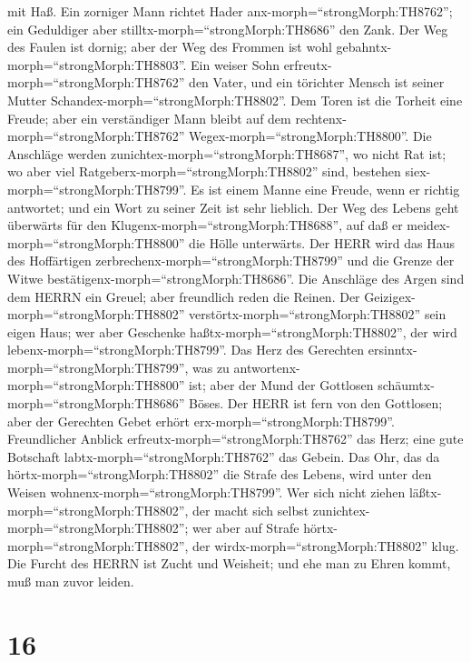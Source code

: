 mit Haß.  Ein zorniger Mann richtet Hader
anx-morph=``strongMorph:TH8762''; ein Geduldiger aber
stilltx-morph=``strongMorph:TH8686'' den Zank.  Der Weg des
Faulen ist dornig; aber der Weg des Frommen ist wohl
gebahntx-morph=``strongMorph:TH8803''.  Ein weiser Sohn
erfreutx-morph=``strongMorph:TH8762'' den Vater, und ein törichter
Mensch ist seiner Mutter Schandex-morph=``strongMorph:TH8802''.
 Dem Toren ist die Torheit eine Freude; aber ein
verständiger Mann bleibt auf dem rechtenx-morph=``strongMorph:TH8762''
Wegex-morph=``strongMorph:TH8800''.  Die Anschläge werden
zunichtex-morph=``strongMorph:TH8687'', wo nicht Rat ist; wo aber viel
Ratgeberx-morph=``strongMorph:TH8802'' sind, bestehen
siex-morph=``strongMorph:TH8799''.  Es ist einem Manne eine
Freude, wenn er richtig antwortet; und ein Wort zu seiner Zeit ist sehr
lieblich.  Der Weg des Lebens geht überwärts für den
Klugenx-morph=``strongMorph:TH8688'', auf daß er
meidex-morph=``strongMorph:TH8800'' die Hölle unterwärts. 
Der HERR wird das Haus des Hoffärtigen
zerbrechenx-morph=``strongMorph:TH8799'' und die Grenze der Witwe
bestätigenx-morph=``strongMorph:TH8686''.  Die Anschläge
des Argen sind dem HERRN ein Greuel; aber freundlich reden die Reinen.
 Der Geizigex-morph=``strongMorph:TH8802''
verstörtx-morph=``strongMorph:TH8802'' sein eigen Haus; wer aber
Geschenke haßtx-morph=``strongMorph:TH8802'', der wird
lebenx-morph=``strongMorph:TH8799''.  Das Herz des
Gerechten ersinntx-morph=``strongMorph:TH8799'', was zu
antwortenx-morph=``strongMorph:TH8800'' ist; aber der Mund der Gottlosen
schäumtx-morph=``strongMorph:TH8686'' Böses.  Der HERR ist
fern von den Gottlosen; aber der Gerechten Gebet erhört
erx-morph=``strongMorph:TH8799''.  Freundlicher Anblick
erfreutx-morph=``strongMorph:TH8762'' das Herz; eine gute Botschaft
labtx-morph=``strongMorph:TH8762'' das Gebein.  Das Ohr,
das da hörtx-morph=``strongMorph:TH8802'' die Strafe des Lebens, wird
unter den Weisen wohnenx-morph=``strongMorph:TH8799''.  Wer
sich nicht ziehen läßtx-morph=``strongMorph:TH8802'', der macht sich
selbst zunichtex-morph=``strongMorph:TH8802''; wer aber auf Strafe
hörtx-morph=``strongMorph:TH8802'', der
wirdx-morph=``strongMorph:TH8802'' klug.  Die Furcht des
HERRN ist Zucht und Weisheit; und ehe man zu Ehren kommt, muß man zuvor
leiden.

\hypertarget{section-15}{%
\section{16}\label{section-15}}


